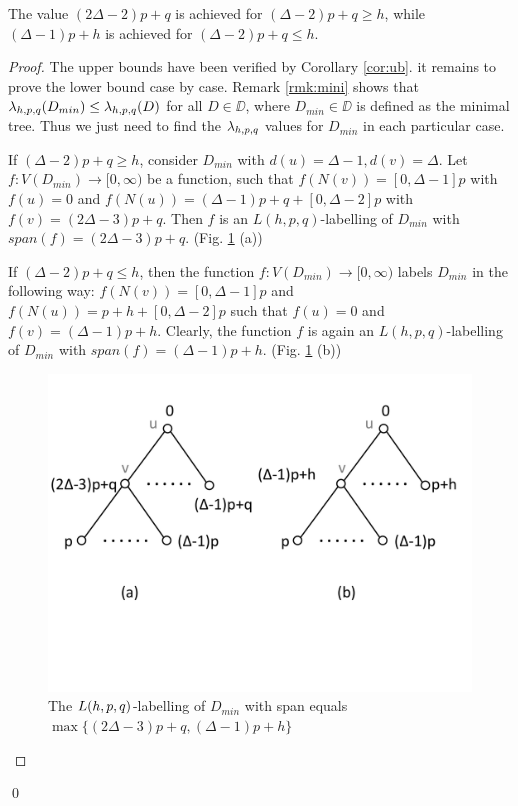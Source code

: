 The value $(2\Delta-2)p+q$ is achieved for $(\Delta-2)p+q \ge h$, while $(\Delta-1)p+h$ is achieved for $(\Delta-2)p+q \le h$. 
\begin{proof}
The upper bounds have been verified by Corollary \ref{cor:ub}. it remains to prove the lower bound case by case. Remark \ref{rmk:mini} shows that $\lambda_{h,p,q}(D_{min}) \le \lambda_{h,p,q}(D)$ for all $D \in \DD$, where $D_{min} \in \DD$ is defined as the minimal tree. Thus we just need to find the $\lambda_{h,p,q}$  values for $D_{min}$ in each particular case. 

If $(\Delta-2)p+q \ge h$, consider $D_{min}$ with $d(u) = \Delta-1, d(v) = \Delta$. Let $f:V(D_{min}) \rightarrow [0, \infty)$ be a function, such that $f(N(v)) = [0,\Delta-1]p$ with $f(u) = 0$ and $f(N(u))=(\Delta-1)p+q+[0,\Delta-2]p$ with $f(v) = (2\Delta-3)p+q$. Then $f$ is an $L(h,p,q)$-labelling of $D_{min}$ with $span(f) = (2\Delta-3)p+q$. (Fig. \ref{ce2} (a))

If $(\Delta-2)p+q \le h$, then the function $f: V(D_{min}) \rightarrow [0,\infty)$ labels $D_{min}$ in the following way: $f(N(v))=[0,\Delta-1]p$ and $f(N(u))=p+h+[0,\Delta-2]p$ such that $f(u)=0$ and $f(v) = (\Delta-1)p+h$. Clearly, the function $f$ is again an $L(h,p,q)$-labelling of $D_{min}$ with $span(f) = (\Delta-1)p+h$. (Fig. \ref{ce2} (b))
\begin{figure}
\centering
      \vspace{-15pt}
    \includegraphics[scale=0.4]{../figures/fig3-7.pdf}
        \vspace{-60pt}
\caption{The $L(h,p,q)$-labelling of $D_{min}$ with span equals $\max\{(2\Delta - 3)p+q, (\Delta-1)p+h\}$}
\label{ce2}
\end{figure}
\end{proof}
\qed

